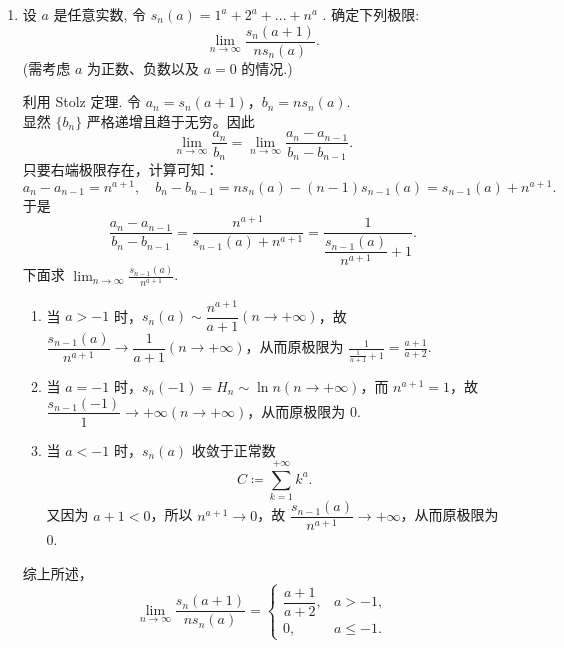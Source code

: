 \begin{enumerate}
    \item[7.]设 \(a\) 是任意实数, 令 \(\displaystyle s_{n}(a) = 1^{a} + 2^{a} + \dots + n^{a}\) . 确定下列极限:
    \[\displaystyle \lim_{n \to \infty} \frac{s_{n}(a+1)}{n s_{n}(a)}.\]
    (需考虑 \(a\) 为正数、负数以及 \(a = 0\) 的情况.)
    \begin{solution}
        利用 Stolz 定理. 令 $a_n = s_n(a+1)$，$b_n = n s_n(a)$.\\
        显然 $\{b_n\}$ 严格递增且趋于无穷。因此
        \[
        \lim_{n\to\infty} \frac{a_n}{b_n} = \lim_{n\to\infty} \frac{a_n - a_{n-1}}{b_n - b_{n-1}}.
        \]
        只要右端极限存在，计算可知：
        \[
        a_n - a_{n-1} = n^{a+1}, \quad b_n - b_{n-1} = n s_n(a) - (n-1) s_{n-1}(a) = s_{n-1}(a) + n^{a+1}.
        \]
        于是
        \[
        \frac{a_n - a_{n-1}}{b_n - b_{n-1}} = \frac{n^{a+1}}{s_{n-1}(a) + n^{a+1}} = \frac{1}{\dfrac{s_{n-1}(a)}{n^{a+1}} + 1}.
        \]
        下面求 $\displaystyle\lim_{n\to\infty} \frac{s_{n-1}(a)}{n^{a+1}}$.
        \begin{enumerate}
        \item[i.]当 $a > -1$ 时，$s_n(a) \sim \dfrac{n^{a+1}}{a+1}(n\to+\infty)$，故 $\dfrac{s_{n-1}(a)}{n^{a+1}} \to \dfrac{1}{a+1}(n\to+\infty)$，从而原极限为 $\displaystyle\frac{1}{\frac{1}{a+1} + 1} = \frac{a+1}{a+2}$.\\
        \item[ii.]当 $a = -1$ 时，$s_n(-1) = H_n \sim \ln n(n\to+\infty)$，而 $n^{a+1} = 1$，故 $\dfrac{s_{n-1}(-1)}{1} \to +\infty(n\to+\infty)$，从而原极限为 $0$.\\
        \item[iii.]当 $a < -1$ 时，$s_n(a)$ 收敛于正常数 
        \[
        C \coloneqq \sum_{k=1}^{+\infty} k^a.
        \]
        又因为 $a+1 < 0$，所以 $n^{a+1} \to 0$，故 $\dfrac{s_{n-1}(a)}{n^{a+1}} \to +\infty$，从而原极限为 $0$.\\
        \end{enumerate}
        综上所述，
        \[
        \lim_{n \to \infty} \frac{s_n(a+1)}{n s_n(a)} = 
        \begin{cases}
            \dfrac{a+1}{a+2}, & a > -1, \\[8pt]
            0, & a \le -1.
        \end{cases}
        \]
    \end{solution}


\end{enumerate}

